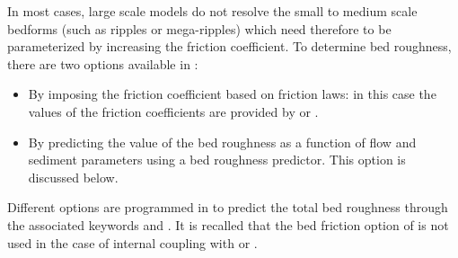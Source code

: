 In most cases, large scale models do not resolve the small to medium
scale bedforms (such as ripples or mega-ripples) which need therefore to be parameterized by increasing the friction coefficient. To determine bed roughness, there are two options available in \gaia{}:
\begin{itemize}
\item By imposing the friction coefficient based on friction laws: in this case the values of the friction coefficients are provided by  or .
\item By predicting the value of the bed roughness as a function of flow and sediment parameters using a bed roughness predictor. This option is discussed below.
\end{itemize}
Different options are programmed in \gaia to predict the total bed
roughness through the associated keywords  and . It is recalled that the bed friction option of \gaia is not
used in the case of internal coupling with  or .
